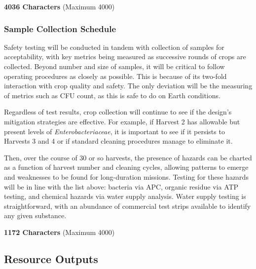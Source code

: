 
\textbf{4036 Characters} (Maximum 4000)

\subsubsection{Sample Collection Schedule}
Safety testing will be conducted in tandem with collection of samples for acceptability, with key metrics being measured as successive rounds of crops are collected. Beyond number and size of samples, it will be critical to follow operating procedures as closely as possible. This is because of its two-fold interaction with crop quality and safety. The only deviation will be the measuring of metrics such as CFU count, as this is safe to do on Earth conditions.

Regardless of test results, crop collection will continue to see if the design's mitigation strategies are effective. For example, if Harvest 2 has allowable but present levels of \textit{Enterobacteriaceae}, it is important to see if it persists to Harvests 3 and 4 or if standard cleaning procedures manage to eliminate it.

Then, over the course of 30 or so harvests, the presence of hazards can be charted as a function of harvest number and cleaning cycles, allowing patterns to emerge and weaknesses to be found for long-duration missions. Testing for these hazards will be in line with the list above: bacteria via APC, organic residue via ATP testing, and chemical hazards via water supply analysis. Water supply testing is straightforward, with an abundance of commercial test strips available to identify any given substance.

\textbf{1172 Characters} (Maximum 4000)

\clearpage

\subsection{Resource Outputs}

